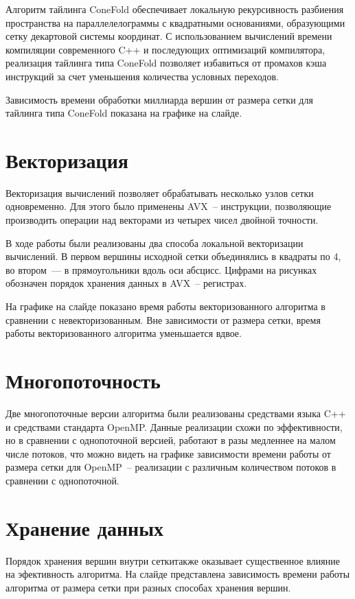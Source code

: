 \documentclass[18pt]{article}
\begin{document}
Алгоритм тайлинга ConeFold обеспечивает локальную рекурсивность разбиения
пространства на параллелелограммы с квадратными основаниями, образующими сетку
декартовой системы координат. 
С использованием вычислений времени компиляции современного C++ и 
последующих оптимизаций компилятора, реализация тайлинга типа ConeFold 
позволяет избавиться от промахов кэша инструкций за счет уменьшения количества
условных переходов.

Зависимость времени обработки миллиарда вершин от размера сетки для тайлинга
типа ConeFold показана на графике на слайде.

\section{Векторизация}
\par
Векторизация вычислений позволяет обрабатывать несколько узлов сетки 
одновременно. Для этого было применены AVX~-- инструкции, позволяющие 
производить операции над векторами из четырех чисел двойной точности.

В ходе работы были реализованы два способа локальной векторизации вычислений.
В первом вершины исходной сетки объединялись в квадраты по 4, 
во втором~--- в прямоугольники вдоль оси абсцисс.
Цифрами на рисунках обозначен порядок хранения данных в AVX~-- регистрах.

На графике на слайде показано время работы векторизованного алгоритма в 
сравнении с невекторизованным. Вне зависимости от размера сетки, время работы 
векторизованного алгоритма уменьшается вдвое.

\section{Многопоточность}
\par
Две многопоточные версии алгоритма были реализованы средствами языка C++ и 
средствами стандарта OpenMP. Данные реализации схожи по эффективности, но в 
сравнении с однопоточной версией, работают в разы медленнее на малом числе 
потоков, что можно видеть на графике зависимости времени работы от 
размера сетки для OpenMP~-- реализации с различным количеством потоков 
в сравнении с однопоточной.

\section{Хранение данных}
\par
Порядок хранения вершин внутри сеткитакже оказывает существенное влияние на 
эфективность алгоритма. На слайде представлена зависимость времени 
работы алгоритма от размера сетки при разных способах хранения вершин.
\end{document}
